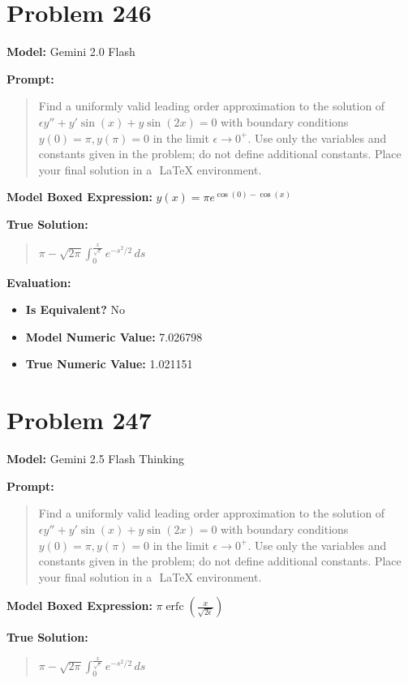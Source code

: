 \documentclass{article}
\begin{document}
{\section*{Problem 246}
\textbf{Model:} Gemini 2.0 Flash

\textbf{Prompt:}
\begin{quote}
Find a uniformly valid leading order approximation to the solution of $\epsilon y'' + y' \sin(x) + y \sin(2x) = 0$ with boundary conditions $y(0) = \pi, y(\pi) = 0$ in the limit $\epsilon \to 0^+$. Use only the variables and constants given in the problem; do not define additional constants. Place your final solution in a $\boxed{}$ LaTeX environment.
\end{quote}
\textbf{Model Boxed Expression:} $y(x) = \pi e^{\cos(0) - \cos(x)}$

\textbf{True Solution:}
\begin{quote}
$\pi - \sqrt{2\pi} \int_0^{\frac{x}{\sqrt{\epsilon}}} e^{-s^2/2} \, ds$
\end{quote}

\textbf{Evaluation:}
\begin{itemize}
\item \textbf{Is Equivalent?} No
\item \textbf{Model Numeric Value:} 7.026798
\item \textbf{True Numeric Value:} 1.021151
\end{itemize}
\vspace{1cm}
\section*{Problem 247}
\textbf{Model:} Gemini 2.5 Flash Thinking

\textbf{Prompt:}
\begin{quote}
Find a uniformly valid leading order approximation to the solution of $\epsilon y'' + y' \sin(x) + y \sin(2x) = 0$ with boundary conditions $y(0) = \pi, y(\pi) = 0$ in the limit $\epsilon \to 0^+$. Use only the variables and constants given in the problem; do not define additional constants. Place your final solution in a $\boxed{}$ LaTeX environment.
\end{quote}
\textbf{Model Boxed Expression:} $\pi \operatorname{erfc}\left(\frac{x}{\sqrt{2\epsilon}}\right)$

\textbf{True Solution:}
\begin{quote}
$\pi - \sqrt{2\pi} \int_0^{\frac{x}{\sqrt{\epsilon}}} e^{-s^2/2} \, ds$
\end{quote}

}
\end{document}

